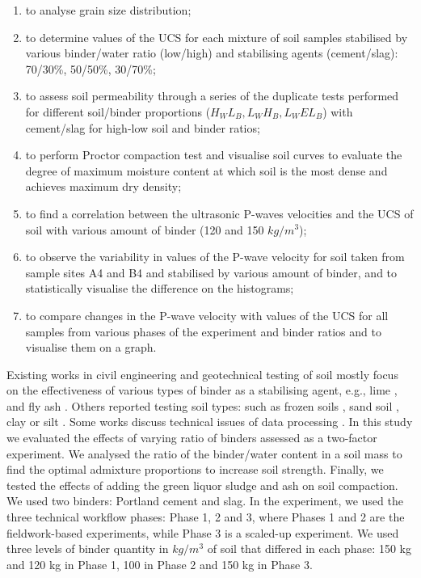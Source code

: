 \documentclass{amestyle}
\begin{document}
\begin{enumerate}
   \item to analyse grain size distribution;
   \item to determine values of the UCS for each mixture of soil samples stabilised by various binder/water ratio (low/high) and stabilising agents (cement/slag): 70/30\%, 50/50\%, 30/70\%; 
  \item to assess soil permeability through a series of the duplicate tests performed for different soil/binder proportions ($H_WL_B,L_WH_B,L_WEL_B$) with cement/slag for high-low soil and binder ratios;
  \item to perform Proctor compaction test and visualise soil curves to evaluate the degree of maximum moisture content at which soil is the most dense and achieves maximum dry density;
  \item to find a correlation between the ultrasonic P-waves velocities and the UCS of soil with various amount of binder (120 and 150 $kg/m^3$);
  \item to observe the variability in values of the P-wave velocity for soil taken from sample sites A4 and B4 and stabilised by various amount of binder, and to statistically visualise the difference on the histograms;
  \item to compare changes in the P-wave velocity with values of the UCS for all samples from various phases of the experiment and binder ratios and to visualise them on a graph.
\end{enumerate}

Existing works in civil engineering and geotechnical testing of soil mostly focus on the effectiveness of various types of binder as a stabilising agent, e.g., lime \cite{Rao,Mukhtar,Swaidani}, and fly ash \cite{Phetchuay}. Others reported testing soil types: such as frozen soils \cite{Lemenkov2021b,Lemenkov2021c}, sand soil \cite{Robertson}, clay or silt \cite{Komal}. Some works discuss technical issues of data processing \cite{Kaellenetal2014,Lemenkov2021c}. In this study we evaluated the effects of varying ratio of binders assessed as a two-factor experiment. We analysed the ratio of the binder/water content in a soil mass to find the optimal admixture proportions to increase soil strength. Finally, we tested the effects of adding the green liquor sludge and ash on soil compaction. We used two binders: Portland cement and slag. In the experiment, we used the three technical workflow phases: Phase 1, 2 and 3, where Phases 1 and 2 are the fieldwork-based experiments, while Phase 3 is a scaled-up experiment. We used three levels of binder quantity in $kg/m^3$ of soil that differed in each phase: 150 kg and 120 kg in Phase 1, 100 in Phase 2 and 150 kg in Phase 3.
\end{document}
